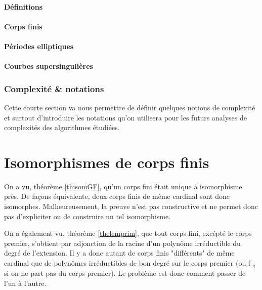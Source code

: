 \documentclass[a4paper]{article} %
\numberwithin{section}{part}
\numberwithin{equation}{section}
\newcommand\GF[1]{\mathbb{F}_{#1}}
\begin{document}
\subsection{Définitions}

\subsection{Corps finis}

\subsection{Périodes elliptiques}

\subsection{Courbes supersingulières}

\section{Complexité \& notations}
Cette courte section va nous permettre de définir quelques notions de complexité
et surtout d'introduire les notations qu'on utilisera pour les futurs analyses
de complexités des algorithmes étudiées.

\part{Isomorphismes de corps finis}
\label{deux}
On a vu, théorème \ref{thisomGF}, qu'un corps fini était unique à isomorphisme
près. De façons équivalente, deux corps finis de même cardinal sont donc 
isomorphes. Malheureusement, la preuve n'est pas constructive et ne permet donc 
pas d'expliciter ou de construire un tel isomorphisme.\par
On a également vu, théorème \ref{thelemprim}, que tout corps fini, excépté le 
corps premier, s'obtient par adjonction de la racine d'un polynôme irréductible
du degré de l'extension. Il y a donc autant de corps finis "différents" de même
cardinal que de polynômes irréductibles de bon degré sur le corps premier (ou 
$\GF{q}$ si on ne part pas du corps premier). Le problème est donc comment 
passer de l'un à l'autre.\par
\end{document}
